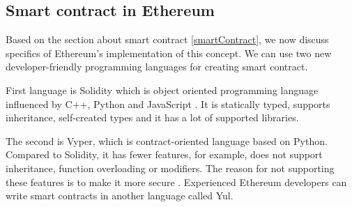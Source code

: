 \documentclass[thesis=M,english]{FITthesis}[2019/12/23]
\begin{document}
\subsection{Smart contract in Ethereum}




Based on the section about smart contract \ref{smartContract}, we now discuss specifics of Ethereum's implementation of this concept. We can use two new developer-friendly programming languages for creating smart contract.

First language is Solidity which is object oriented programming language influenced by C++, Python and JavaScript \cite{solidityDoc}. It is statically typed, supports inheritance, self-created types and it has a lot of supported libraries. 

The second is Vyper, which is contract-oriented language based on Python. Compared to Solidity, it has fewer features, for example, does not support inheritance, function overloading or modifiers. The reason for not supporting these features is to make it more secure \cite{vyperDoc}. Experienced Ethereum developers can write smart contracts in another language called Yul.
\end{document}
